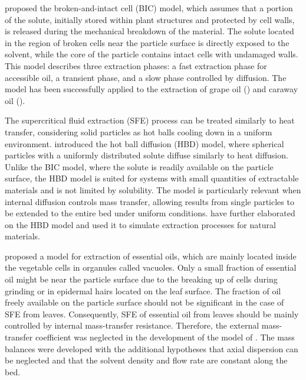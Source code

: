 \documentclass[a4paper,fleqn]{cas-dc}
\begin{document}
	\citet{Sovova1994} proposed the broken-and-intact cell (BIC) model, which assumes that a portion of the solute, initially stored within plant structures and protected by cell walls, is released during the mechanical breakdown of the material. The solute located in the region of broken cells near the particle surface is directly exposed to the solvent, while the core of the particle contains intact cells with undamaged walls. This model describes three extraction phases: a fast extraction phase for accessible oil, a transient phase, and a slow phase controlled by diffusion. The model has been successfully applied to the extraction of grape oil (\citet{Sovova1994b}) and caraway oil (\citet{Sovova1994a}).
	
	The supercritical fluid extraction (SFE) process can be treated similarly to heat transfer, considering solid particles as hot balls cooling down in a uniform environment. \citet{Bartle1990} introduced the hot ball diffusion (HBD) model, where spherical particles with a uniformly distributed solute diffuse similarly to heat diffusion. Unlike the BIC model, where the solute is readily available on the particle surface, the HBD model is suited for systems with small quantities of extractable materials and is not limited by solubility. The model is particularly relevant when internal diffusion controls mass transfer, allowing results from single particles to be extended to the entire bed under uniform conditions. \citet{Reverchon1993} have further elaborated on the HBD model and used it to simulate extraction processes for natural materials.
	
	\citet{Reverchon1996} proposed a model for extraction of essential oils, which are mainly located inside the vegetable cells in organules called vacuoles. Only a small fraction of essential oil might be near the particle surface due to the breaking up of cells during grinding or in epidermal hairs located on the leaf surface. The fraction of oil freely available on the particle surface should not be significant in the case of SFE from leaves. Consequently, SFE of essential oil from leaves should be mainly controlled by  internal mass-transfer resistance. Therefore, the external mass-transfer coefficient was neglected in the development of the model of \citet{Reverchon1996}. The mass balances were developed with the additional hypotheses that axial dispersion can be neglected and that the solvent density and flow rate are constant along the bed.
	
\end{document}
